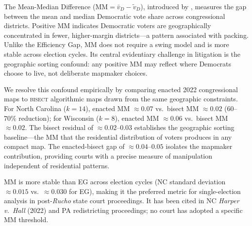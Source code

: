 The Mean-Median Difference ($\text{MM} = \bar{v}_D - \tilde{v}_D$), introduced by \citet{wang2016},
measures the gap between the mean and median Democratic vote share across congressional districts.
Positive MM indicates Democratic voters are geographically concentrated in fewer, higher-margin
districts---a pattern associated with packing. Unlike the Efficiency Gap, MM does not require
a swing model and is more stable across election cycles. Its central evidentiary challenge
in litigation is the geographic sorting confound: any positive MM may reflect where Democrats
choose to live, not deliberate mapmaker choices.

We resolve this confound empirically by comparing enacted 2022 congressional maps to
\textsc{bisect} algorithmic maps drawn from the same geographic constraints.
For North Carolina ($k=14$), enacted MM $\approx 0.07$ vs.\ bisect MM $\approx 0.02$
(60--70\% reduction); for Wisconsin ($k=8$), enacted MM $\approx 0.06$ vs.\ bisect MM $\approx 0.02$.
The bisect residual of $\approx 0.02$--$0.03$ establishes the geographic sorting baseline---the
MM that the residential distribution of voters produces in any compact map. The enacted-bisect
gap of $\approx 0.04$--$0.05$ isolates the mapmaker contribution, providing courts with
a precise measure of manipulation independent of residential patterns.

MM is more stable than EG across election cycles (NC standard deviation $\approx 0.015$ vs.\
$\approx 0.030$ for EG), making it the preferred metric for single-election analysis in
post-\textit{Rucho} state court proceedings. It has been cited in NC \textit{Harper v.\ Hall}
(2022) and PA redistricting proceedings; no court has adopted a specific MM threshold.
